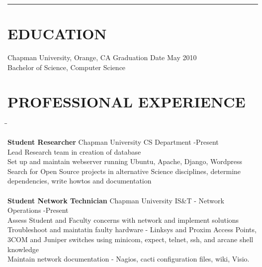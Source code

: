 \documentclass{res}
\begin{document}
 


\address{5205 E. Rolling Hill Drive\\Anaheim, CA 92807}

\address{\hspace{28pt}yasumoto7@gmail.com\\smith237@mail.chapman.edu}

\begin{resume}

\rule{\textwidth}{1pt}

\section{EDUCATION}          
	 Chapman University, Orange, CA \hspace{2.9in} Graduation Date May 2010\\
	 Bachelor of Science, Computer Science \\

   \vspace{-0.2in}	
\section{PROFESSIONAL EXPERIENCE}
   \vspace{-5pt}      %
   \begin{tabbing}
   \hspace{2.5in}\= \hspace{3.45in}\= \kill %

    {\bf Student Researcher} \>Chapman University CS Department     -Present\\
	 Lead Research team in creation of database\\
	 Set up and maintain webserver running Ubuntu, Apache, Django, Wordpress\\
	 Search for Open Source projects in alternative Science disciplines, determine dependencies, write howtos and documentation\\

\\

    {\bf Student Network Technician} \>Chapman University IS\&T - Network Operations -Present\\
	 Assess Student and Faculty concerns with network and implement solutions\\
	 Troubleshoot and maintatin faulty hardware - Linksys and Proxim Access Points, 3COM and Juniper switches using minicom, expect, telnet, ssh, and arcane shell knowledge\\
	 Maintain network documentation - Nagios, cacti configuration files, wiki, Visio.\\


\end{tabbing}
\end{resume}
\end{document}

